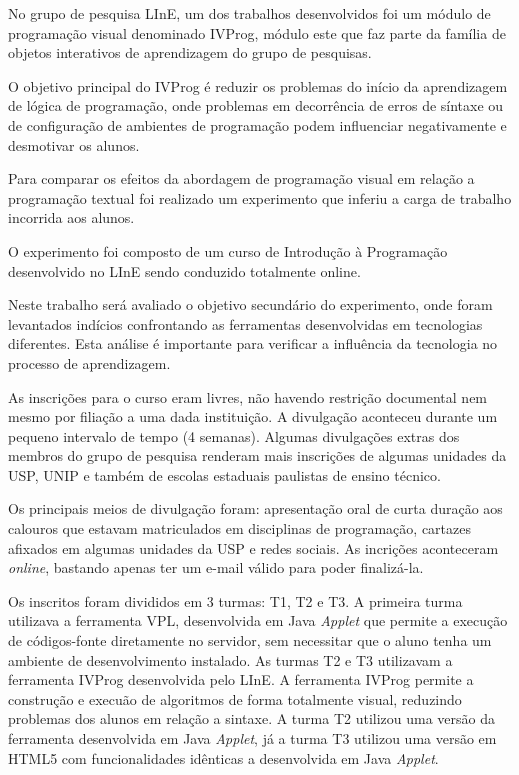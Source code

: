No grupo de pesquisa LInE, um dos trabalhos desenvolvidos foi um módulo de programação visual denominado IVProg, módulo este que faz parte da família de objetos interativos de aprendizagem do grupo de pesquisas.

O objetivo principal do IVProg é reduzir os problemas do início da aprendizagem de lógica de programação, onde problemas em decorrência de erros de síntaxe ou de configuração de ambientes de programação podem influenciar negativamente e desmotivar os alunos.

Para comparar os efeitos da abordagem de programação visual em relação a programação textual foi realizado um experimento que inferiu a carga de trabalho incorrida aos alunos.

O experimento foi composto de um curso de Introdução à Programação desenvolvido no LInE sendo conduzido totalmente online.

Neste trabalho será avaliado o objetivo secundário do experimento, onde foram levantados indícios confrontando as ferramentas desenvolvidas em tecnologias diferentes. Esta análise é importante para verificar a influência da tecnologia no processo de aprendizagem.

As inscrições para o curso eram livres, não havendo restrição documental nem mesmo por filiação a uma dada instituição. A divulgação aconteceu durante um pequeno intervalo de tempo (4 semanas). Algumas divulgações extras dos membros do grupo de pesquisa renderam mais inscrições de algumas unidades da USP, UNIP e também de escolas estaduais paulistas de ensino técnico.

Os principais meios de divulgação foram: apresentação oral de curta duração aos calouros que estavam matriculados em disciplinas de programação, cartazes afixados em algumas unidades da USP e redes sociais. As incrições aconteceram \emph{online}, bastando apenas ter um e-mail válido para poder finalizá-la.

Os inscritos foram divididos em 3 turmas: T1, T2 e T3. A primeira turma utilizava a ferramenta VPL, desenvolvida em Java \emph{Applet} que permite a execução de códigos-fonte diretamente no servidor, sem necessitar que o aluno tenha um ambiente de desenvolvimento instalado. As turmas T2 e T3 utilizavam a ferramenta IVProg desenvolvida pelo LInE. A ferramenta IVProg permite a construção e execuão de algoritmos de forma totalmente visual, reduzindo problemas dos alunos em relação a sintaxe. A turma T2 utilizou uma versão da ferramenta desenvolvida em Java \emph{Applet}, já a turma T3 utilizou uma versão em HTML5 com funcionalidades idênticas a desenvolvida em Java \emph{Applet}.

